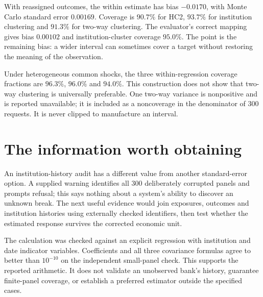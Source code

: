 With reassigned outcomes, the within estimate has bias $-0.0170$, with Monte
Carlo standard error $0.00169$. Coverage is $90.7\%$ for HC2, $93.7\%$ for
institution clustering and $91.3\%$ for two-way clustering. The evaluator's
correct mapping gives bias $0.00102$ and institution-cluster coverage $95.0\%$.
The point is the remaining bias: a wider interval can sometimes cover a target
without restoring the meaning of the observation.

Under heterogeneous common shocks, the three within-regression coverage
fractions are $96.3\%$, $96.0\%$ and $94.0\%$. This construction does not show
that two-way clustering is universally preferable. One two-way variance is
nonpositive and is reported unavailable; it is included as a noncoverage in
the denominator of 300 requests. It is never clipped to manufacture an interval.

\section{The information worth obtaining}
An institution-history audit has a different value from another standard-error
option. A supplied warning identifies all 300 deliberately corrupted panels
and prompts refusal; this says nothing about a system's ability to discover an
unknown break. The next useful evidence would join exposures, outcomes and
institution histories using externally checked identifiers, then test whether
the estimated response survives the corrected economic unit.

The calculation was checked against an explicit regression with institution
and date indicator variables. Coefficients and all three covariance formulas
agree to better than $10^{-10}$ on the independent small-panel check. This
supports the reported arithmetic. It does not validate an unobserved bank's
history, guarantee finite-panel coverage, or establish a preferred estimator
outside the specified cases.

